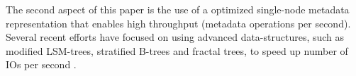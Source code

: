 The second aspect of this paper is the use of a optimized single-node metadata
representation that enables high throughput (metadata operations per second).
Several recent efforts have focused on using advanced data-structures, such
as modified LSM-trees, stratified B-trees and fractal trees, to speed up number
of IOs per second \cite{blsm, tokufs, Andrew11}. 


